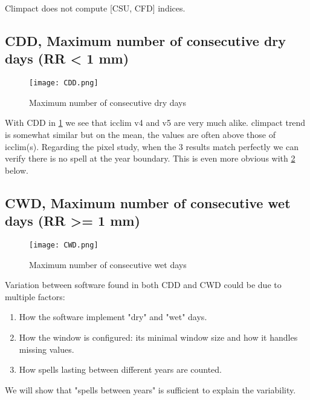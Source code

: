 \documentclass[a4paper,11pt]{article}
\begin{document}
        Climpact does not compute [CSU, CFD] indices.

        \subsection{CDD, Maximum number of consecutive dry days (RR < 1 mm)}
            \begin{figure}[!hbt]
                \centering
                \texttt{[image: CDD.png]}
                \caption{Maximum number of consecutive dry days}
                \label{figure/cdd}
            \end{figure}
            With CDD in \ref{figure/cdd} we see that icclim v4 and v5 are very much alike.
            climpact trend is somewhat similar but on the mean, the values are often above those of icclim(s).
            Regarding the pixel study, when the 3 results match perfectly we can verify there is no spell at the year boundary.
            This is even more obvious with \ref{figure/cwd} below.

        \subsection{CWD, Maximum number of consecutive wet days (RR >= 1 mm)}
            \begin{figure}[!hbt]
                \centering
                \texttt{[image: CWD.png]}
                \caption{Maximum number of consecutive wet days}
                \label{figure/cwd}
            \end{figure}

            Variation between software found in both CDD and CWD could be due to multiple factors:
            \begin{enumerate}
                \item How the software implement "dry" and "wet" days.
                \item How the window is configured: its minimal window size and how it handles missing values.
                \item How spells lasting between different years are counted.
            \end{enumerate}

            We will show that "spells between years" is sufficient to explain the variability.
            
\end{document}
